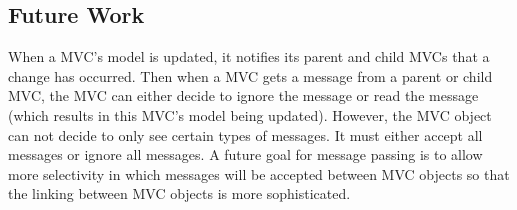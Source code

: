\documentclass{article}[11pt]
\begin{document}
\subsection{Future Work}\label{Ssec:Further}

When a MVC's model is updated, it notifies its parent and child
MVCs that a change has occurred.  Then when a MVC gets a message from a
parent or child MVC, the MVC can either decide to ignore the message or read
the message (which results in this MVC's model being updated).  However, the
MVC object can not decide to only see certain types of messages.  It must
either accept all messages or ignore all messages.  A future goal for message
passing is to allow more selectivity in which messages will be accepted
between MVC objects so that the linking between MVC objects is more
sophisticated. 
\end{document}

